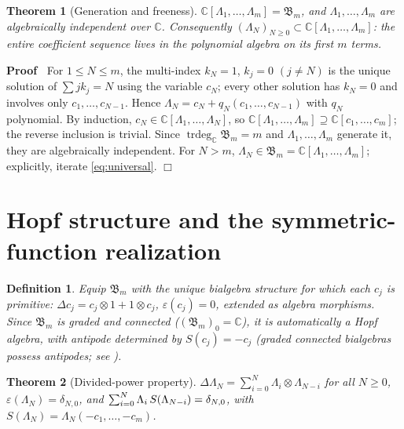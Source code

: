 \documentclass{article}
\newcommand{\tmem}[1]{{\em #1\/}}
\newcommand{\tmop}[1]{\ensuremath{\operatorname{#1}}}
\newenvironment{proof}{\noindent\textbf{Proof\ }}{\hspace*{\fill}$\Box$\medskip}
\newtheorem{definition}{Definition}
\newtheorem{theorem}{Theorem}
\newcommand{\trdeg}{\tmop{trdeg}}
\newcommand{\CA}{\mathfrak{B}}
\newcommand{\C}{\mathbb{C}}
\begin{document}
\begin{theorem}
  [Generation and freeness]\label{thm:generation} $\C [\Lambda_1, \ldots,
  \Lambda_m] = \CA_m$, and $\Lambda_1, \ldots, \Lambda_m$ are algebraically
  independent over $\C$. Consequently $(\Lambda_N)_{N \ge 0} \subset \C
  [\Lambda_1, \ldots, \Lambda_m]$: the entire coefficient sequence lives in
  the polynomial algebra on its first $m$ terms.
\end{theorem}

\begin{proof}
  For $1 \le N \le m$, the multi-index $k_N = 1$, $k_j = 0$ $(j \ne N)$ is the
  unique solution of $\sum jk_j = N$ using the variable $c_N$; every other
  solution has $k_N = 0$ and involves only $c_1, \ldots, c_{N - 1}$. Hence
  $\Lambda_N = c_N + q_N (c_1, \ldots, c_{N - 1})$ with $q_N$ polynomial. By
  induction, $c_N \in \C [\Lambda_1, \ldots, \Lambda_N]$, so $\C [\Lambda_1,
  \ldots, \Lambda_m] \supseteq \C [c_1, \ldots, c_m]$; the reverse inclusion
  is trivial. Since $\trdeg_{\C} \CA_m = m$ and $\Lambda_1, \ldots, \Lambda_m$
  generate it, they are algebraically independent. For $N > m$, $\Lambda_N \in
  \CA_m = \C [\Lambda_1, \ldots, \Lambda_m]$; explicitly, iterate
  \eqref{eq:universal}.
\end{proof}

\section{Hopf structure and the symmetric-function
realization}\label{sec:hopf}

\begin{definition}
  \label{def:hopf}Equip $\CA_m$ with the unique bialgebra structure for which
  each $c_j$ is primitive: $\Delta c_j = c_j \otimes 1 + 1 \otimes c_j$,
  $\varepsilon (c_j) = 0$, extended as algebra morphisms. Since $\CA_m$ is
  graded and connected ($(\CA_m)_0 = \C$), it is automatically a Hopf algebra,
  with antipode determined by $S (c_j) = - c_j$ {\tmem{(graded connected
  bialgebras possess antipodes; see
  {\cite[{\textsection}1]{MilnorMoore}}{\hspace{0.17em}})}}.
\end{definition}

\begin{theorem}
  [Divided-power property]\label{thm:dividedpower} $\Delta \Lambda_N = \sum_{i
  = 0}^N \Lambda_i \otimes \Lambda_{N - i}$ for all $N \ge 0$, $\varepsilon
  (\Lambda_N) = \delta_{N, 0}$, and $\sum_{i = 0}^N \Lambda_i  \hspace{0.17em}
  S (\Lambda_{N - i}) = \delta_{N, 0}$, with $S (\Lambda_N) = \Lambda_N  (-
  c_1, \ldots, - c_m)$.
\end{theorem}
\end{document}
